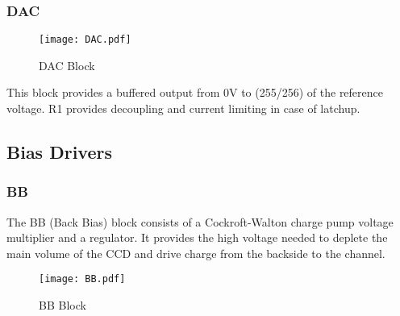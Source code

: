 \documentclass[a4paper,12pt]{article}
\begin{document}
\subsubsection{DAC}
   \begin{figure}
   \begin{center}
   \texttt{[image: DAC.pdf]}
   \end{center}
   \caption{DAC Block}
   \end{figure}
This block provides a buffered output from 0V to (255/256) of the reference voltage. R1 provides decoupling and current limiting in case of latchup.

\subsection{Bias Drivers}
\subsubsection{BB}

The BB (Back Bias) block consists of a Cockroft-Walton charge pump voltage multiplier and a regulator. It provides the high voltage needed to deplete the main volume of the CCD and drive charge from the backside to the channel.

   \begin{figure}
   \begin{center}
   \texttt{[image: BB.pdf]}
   \end{center}
   \caption{BB Block}
   \end{figure}
\end{document}
